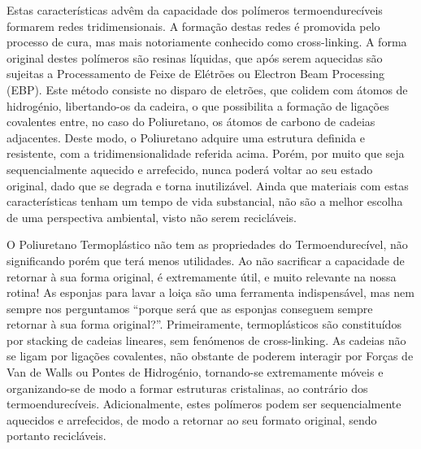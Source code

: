 \documentclass[\mainfilename]{subfiles}
\begin{document}
Estas características advêm da capacidade dos polímeros termoendurecíveis formarem redes tridimensionais. A formação destas redes é promovida pelo processo de cura, mas mais notoriamente conhecido como cross-linking. A forma original destes polímeros são resinas líquidas, que após serem aquecidas são sujeitas a Processamento de Feixe de Elétrões ou Electron Beam Processing (EBP). Este método consiste no disparo de eletrões, que colidem com átomos de hidrogénio, libertando-os da cadeira, o que possibilita a formação de ligações covalentes entre, no caso do Poliuretano, os átomos de carbono de cadeias adjacentes. Deste modo, o Poliuretano adquire uma estrutura definida e resistente, com a tridimensionalidade referida acima. Porém, por muito que seja sequencialmente aquecido e arrefecido, nunca poderá voltar ao seu estado original, dado que se degrada e torna inutilizável. Ainda que materiais com estas características tenham um tempo de vida substancial, não são a melhor escolha de uma perspectiva ambiental, visto não serem recicláveis.\par

O Poliuretano Termoplástico não tem as propriedades do Termoendurecível, não significando porém que terá menos utilidades. Ao não sacrificar a capacidade de retornar à sua forma original, é extremamente útil, e muito relevante na nossa rotina! As esponjas para lavar a loiça são uma ferramenta indispensável, mas nem sempre nos perguntamos ``porque será que as esponjas conseguem sempre retornar à sua forma original?''. Primeiramente, termoplásticos são constituídos por stacking de cadeias lineares, sem fenómenos de cross-linking. As cadeias não se ligam por ligações covalentes, não obstante de poderem interagir por Forças de Van de Walls ou Pontes de Hidrogénio, tornando-se extremamente móveis e organizando-se de modo a formar estruturas cristalinas, ao contrário dos termoendurecíveis. Adicionalmente, estes polímeros podem ser sequencialmente aquecidos e arrefecidos, de modo a retornar ao seu formato original, sendo portanto recicláveis.
\end{document}
